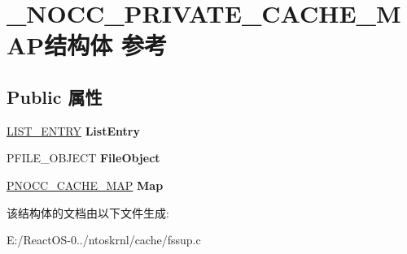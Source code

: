 \hypertarget{struct___n_o_c_c___p_r_i_v_a_t_e___c_a_c_h_e___m_a_p}{}\section{\+\_\+\+N\+O\+C\+C\+\_\+\+P\+R\+I\+V\+A\+T\+E\+\_\+\+C\+A\+C\+H\+E\+\_\+\+M\+A\+P结构体 参考}
\label{struct___n_o_c_c___p_r_i_v_a_t_e___c_a_c_h_e___m_a_p}
\subsection*{Public 属性}
\begin{DoxyCompactItemize}
\item 
\mbox{\label{struct___n_o_c_c___p_r_i_v_a_t_e___c_a_c_h_e___m_a_p_a2580213dd34407a9d9945bf72926ecda}} 
\hyperlink{struct___l_i_s_t___e_n_t_r_y}{L\+I\+S\+T\+\_\+\+E\+N\+T\+RY} {\bfseries List\+Entry}
\item 
\mbox{\label{struct___n_o_c_c___p_r_i_v_a_t_e___c_a_c_h_e___m_a_p_a3a73b02f0ea562015f615702ee944d10}} 
P\+F\+I\+L\+E\+\_\+\+O\+B\+J\+E\+CT {\bfseries File\+Object}
\item 
\mbox{\label{struct___n_o_c_c___p_r_i_v_a_t_e___c_a_c_h_e___m_a_p_a1de033245ee94c7a9f961bacd8b7ee6c}} 
\hyperlink{struct___n_o_c_c___c_a_c_h_e___m_a_p}{P\+N\+O\+C\+C\+\_\+\+C\+A\+C\+H\+E\+\_\+\+M\+AP} {\bfseries Map}
\end{DoxyCompactItemize}


该结构体的文档由以下文件生成\+:\begin{DoxyCompactItemize}
\item 
E\+:/\+React\+O\+S-\/0../ntoskrnl/cache/fssup.\+c\end{DoxyCompactItemize}
